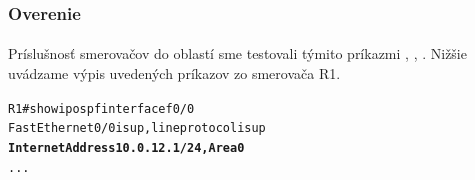 \documentclass[12pt,twoside,a4paper]{report}
\begin{document}
\subsubsection{Overenie}
\paragraph{}
Príslušnosť smerovačov do oblastí sme testovali týmito príkazmi , , . Nižšie uvádzame výpis uvedených príkazov zo smerovača R1.

\noindent
{\selectfont
\begin{small}
\begin{alltt}

R1#show ip ospf interface f0/0
FastEthernet0/0 is up, line protocol is up 
  \textbf{Internet Address 10.0.12.1/24, Area 0}
  ...

\end{alltt}
\end{small}
}
\end{document}
